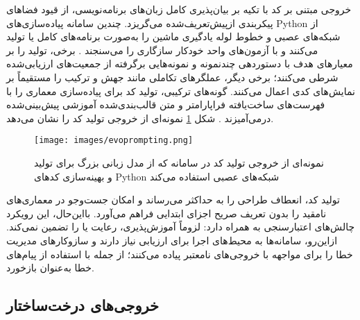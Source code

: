خروجی مبتنی بر کد با تکیه بر بیان‌پذیری کامل زبان‌های برنامه‌نویسی، از قیود فضاهای پیکربندی ازپیش‌تعریف‌شده می‌گریزد. چندین سامانه پیاده‌سازی‌های Python از شبکه‌های عصبی و خطوط لوله یادگیری ماشین را به‌صورت برنامه‌های کامل یا  تولید می‌کنند و با آزمون‌های واحد خودکار سازگاری را می‌سنجند \cite{xu2024largeTextToML, LLMatic2024, chen2023Evoprompting}. برخی، تولید را بر معیارهای هدف با دستوردهی چندنمونه و نمونه‌هایی برگرفته از جمعیت‌های ارزیابی‌شده شرطی می‌کنند؛ برخی دیگر، عملگرهای تکاملی مانند جهش و ترکیب را مستقیماً بر نمایش‌های کدی اعمال می‌کنند. گونه‌های ترکیبی، تولید کد برای پیاده‌سازی معماری را با فهرست‌های ساخت‌یافته فراپارامتر و متن قالب‌بندی‌شده  آموزشی پیش‌بینی‌شده درمی‌آمیزند \cite{zhang2023AutomlGPTAutomaticMachineLearning, trirat2025automlagent}. شکل \ref{fig:evoprompting} نمونه‌ای از خروجی تولید کد را نشان می‌دهد.
\begin{figure}[h!]
    \centering
    \texttt{[image: images/evoprompting.png]}
    \caption[نمونه ای از خروجی تولید کد]{
        نمونه‌ای از خروجی تولید کد در سامانه  که از مدل زبانی بزرگ برای تولید و بهینه‌سازی کدهای Python شبکه‌های عصبی استفاده می‌کند \cite{chen2023Evoprompting}
    }
    \label{fig:evoprompting}
\end{figure}
تولید کد، انعطاف طراحی را به حداکثر می‌رساند و امکان جست‌وجو در معماری‌های نامقید را بدون تعریف صریح اجزای ابتدایی فراهم می‌آورد. بااین‌حال، این رویکرد چالش‌های اعتبارسنجی به همراه دارد:  لزوماً آموزش‌پذیری، رعایت  یا  را تضمین نمی‌کند. ازاین‌رو، سامانه‌ها به محیط‌های اجرا برای ارزیابی نیاز دارند و سازوکارهای مدیریت خطا را برای مواجهه با خروجی‌های نامعتبر پیاده می‌کنند؛ از جمله  با استفاده از پیام‌های خطا به‌عنوان بازخورد.

\subsection{خروجی‌های درخت‌ساختار}

